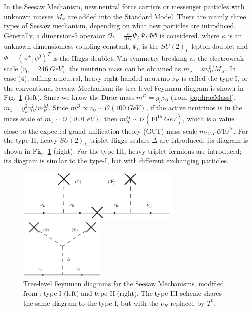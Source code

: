 In the Seesaw Mechanism, new neutral force carriers or messenger particles with unknown masses $M_x$ are added into the Standard Model. There are mainly three types of Seesaw mechanism, depending on what new particles are introduced.  Generally, a dimension-5 operator $\mathcal{O}_5=\frac{\kappa}{M_X}\Psi_{L}\Psi_{L}\Phi\Phi$ is considered, where $\kappa$ is an unknown dimensionless coupling constant, $\Psi_{L}$ is the $SU(2)_L$ lepton doublet and $\Phi=(\phi^+,\phi^0)^T$ is the Higgs doublet\cite{barger2012physics}. Via symmetry breaking at the electroweak scale ($v_0=246~GeV$), the neutrino mass can be obtained as $m_\nu=\kappa v_0^2/M_X$. In case (4), adding a neutral, heavy right-handed neutrino $\nu_R$ is called the type-I, or the conventional Seesaw Mechanism; its tree-level Feynman diagram is shown in Fig.~\ref{seesaw} (left).
Since we know the Dirac mass $m^D=y_\nu v_0$ (from \ref{eq:diracMass}), $m_1=y^2_\nu v_0^2/m^M_R$. Since $m^D\propto v_0\sim\mathcal{O}(100~GeV)$, if the active neutrinos is in the mass scale of $m_1\sim\mathcal{O}(0.01~eV)$, then $m^M_R\sim\mathcal{O}(10^{15}~GeV)$, which is a value close to the expected grand unification theory (GUT) mass scale $m_{GUT}~\mathcal{O}10^{16}$. For the type-II, heavy $SU(2)_L$ triplet Higgs scalars $\Delta$ are introduced; its diagram is shown in Fig.~\ref{seesaw} (right). For the type-III, heavy triplet fermions are introduced; its diagram is similar to the type-I, but with different exchanging particles.

\begin{figure}[htbp]
	\centering	
	\begin{minipage}[t]{0.6\textwidth}%
		\includegraphics[width=8cm]{typeI_seesaw.eps}
	\end{minipage}
	\begin{minipage}[t]{0.3\textwidth}%
		\includegraphics[height=3.0cm]{typeIIseesaw.eps}
	\end{minipage}
	\caption{ Tree-level Feynman diagrams for the Seesaw Mechanisms, modified from \cite{valle2015neutrinos}: type-I (left) and type-II (right). The type-III scheme shares the same diagram to the type-I, but with the $\nu_R$ replaced by $T^0$.}
	\label{seesaw}
\end{figure}


